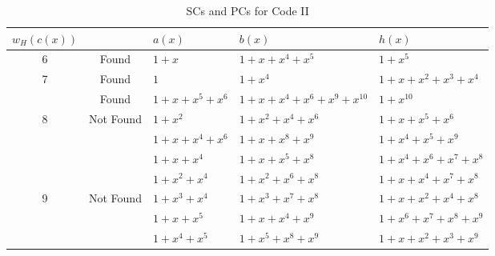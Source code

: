 \begin{table}[htbp]
		\caption{SCs and PCs for Code II}
		\centering
		\begin{tabularx}{0.48\textwidth}{|c|c|XXX} 
			\toprule
			$w_H(c(x))$&~& $a(x)$ & $b(x)$ & $h(x)$ \\ %
			\midrule
			6&Found&$1+x$ & $1+x+x^{4}+x^5$ & $1+x^5$\\
			\cline{1-5}
			7&Found&$1$ & $1+x^4$ & $1+x+x^2+x^3+x^4$\\
			\cline{1-5}
			&Found&$1+x+x^5+x^6$ & $1+x+x^4+x^6+x^9+x^{10}$ & $1+x^{10}$\\
			\cline{2-5}
			8&Not Found&$1+x^2$ 				&$1+x^2+x^4+x^6$ 		& $1+x+x^5+x^6$\\
			&~&$1+x+x^4+x^6$ 		&$1+x+x^8+x^9$			& $1+x^4+x^5+x^9$\\
			\cline{1-5}
			&&$1+x+x^4$ 		&$1+x+x^5+x^8$ 		& $1+x^4+x^6+x^7+x^8$\\
			&&$1+x^2+x^4$ 		&$1+x^2+x^6+x^8$ 		& $1+x+x^4+x^7+x^8$\\
			9&Not Found&$1+x^3+x^4$ 	&$1+x^3+x^7+x^8$ 		& $1+x+x^2+x^4+x^8$\\
			&&$1+x+x^5$ 		&$1+x+x^4+x^9$ 		& $1+x^6+x^7+x^8+x^9$\\
			&&$1+x^4+x^5$ 		&$1+x^5+x^8+x^9$ 		& $1+x+x^2+x^3+x^9$\\
			\bottomrule
		\end{tabularx}		
		\label{code-tables-2}
	\end{table}


